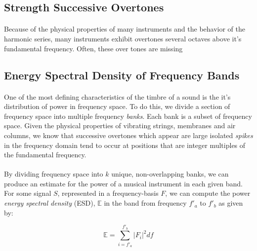\documentclass[12pt,letterpaper]{article}
\begin{document}

\subsection{Strength Successive Overtones}

\paragraph*{}Because of the physical properties of many instruments and the behavior of the harmonic series, many instruments exhibit overtones several octaves above it's fundamental frequency. Often, these over tones are missing




\subsection{Energy Spectral Density of Frequency Bands}

\paragraph*{}One of the most defining characteristics of the timbre of a sound is the it's distribution of power in frequency space. To do this, we divide a section of frequency space into multiple frequency \textit{banks}. Each bank is a subset of frequency space. Given the physical properties of vibrating strings, membranes and air columns, we know that successive overtones which appear are large isolated \textit{spikes} in the frequency domain tend to occur at positions that are integer multiples of the fundamental frequency.

\paragraph*{}By dividing frequency space into $k$ unique, non-overlapping banks, we can produce an estimate for the power of a musical instrument in each given band. For some signal $S$, represented in a frequency-basis $F$, we can compute the power \textit{energy spectral density} (ESD), $\mathbb{E}$ in the band from frequency $f'_a$ to $f'_b$ as given by:

\begin{equation}
\mathbb{E} = \sum_{i=f'_a}^{f'_b} |F_i|^2 df
\end{equation}
\end{document}
